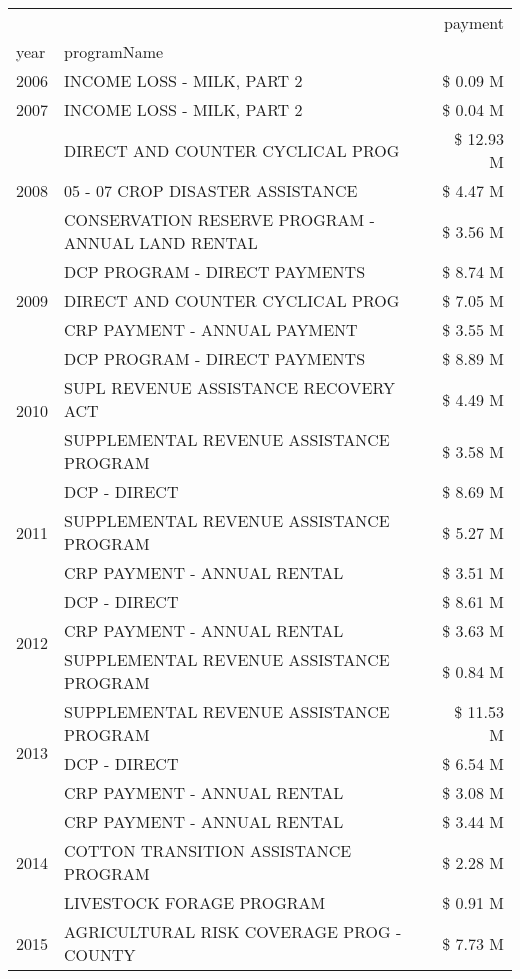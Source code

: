 \begin{tabular}{llr}
\toprule
 &  & payment \\
year & programName &  \\
\midrule
2006 & INCOME LOSS - MILK, PART 2 & \$ 0.09 M \\
\cline{1-3}
2007 & INCOME LOSS - MILK, PART 2 & \$ 0.04 M \\
\cline{1-3}
\multirow[t]{3}{*}{2008} & DIRECT AND COUNTER CYCLICAL PROG & \$ 12.93 M \\
 & 05 - 07 CROP DISASTER ASSISTANCE & \$ 4.47 M \\
 & CONSERVATION RESERVE PROGRAM - ANNUAL LAND RENTAL & \$ 3.56 M \\
\cline{1-3}
\multirow[t]{3}{*}{2009} & DCP PROGRAM - DIRECT PAYMENTS & \$ 8.74 M \\
 & DIRECT AND COUNTER CYCLICAL PROG & \$ 7.05 M \\
 & CRP PAYMENT - ANNUAL PAYMENT & \$ 3.55 M \\
\cline{1-3}
\multirow[t]{3}{*}{2010} & DCP PROGRAM - DIRECT PAYMENTS & \$ 8.89 M \\
 & SUPL REVENUE ASSISTANCE RECOVERY ACT & \$ 4.49 M \\
 & SUPPLEMENTAL REVENUE ASSISTANCE PROGRAM & \$ 3.58 M \\
\cline{1-3}
\multirow[t]{3}{*}{2011} & DCP - DIRECT & \$ 8.69 M \\
 & SUPPLEMENTAL REVENUE ASSISTANCE PROGRAM & \$ 5.27 M \\
 & CRP PAYMENT - ANNUAL RENTAL & \$ 3.51 M \\
\cline{1-3}
\multirow[t]{3}{*}{2012} & DCP - DIRECT & \$ 8.61 M \\
 & CRP PAYMENT - ANNUAL RENTAL & \$ 3.63 M \\
 & SUPPLEMENTAL REVENUE ASSISTANCE PROGRAM & \$ 0.84 M \\
\cline{1-3}
\multirow[t]{3}{*}{2013} & SUPPLEMENTAL REVENUE ASSISTANCE PROGRAM & \$ 11.53 M \\
 & DCP - DIRECT & \$ 6.54 M \\
 & CRP PAYMENT - ANNUAL RENTAL & \$ 3.08 M \\
\cline{1-3}
\multirow[t]{3}{*}{2014} & CRP PAYMENT - ANNUAL RENTAL & \$ 3.44 M \\
 & COTTON TRANSITION ASSISTANCE PROGRAM & \$ 2.28 M \\
 & LIVESTOCK FORAGE PROGRAM & \$ 0.91 M \\
\cline{1-3}
\multirow[t]{3}{*}{2015} & AGRICULTURAL RISK COVERAGE PROG - COUNTY & \$ 7.73 M \\

\end{tabular}
